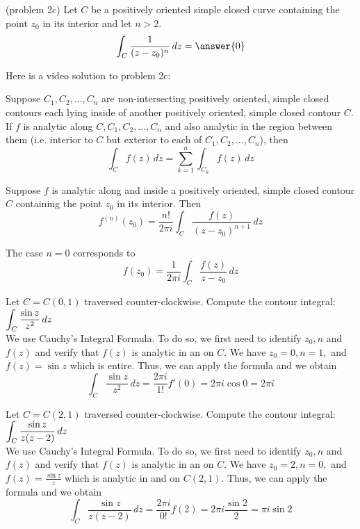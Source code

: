 \documentclass[handout]{ximera}
\begin{document}
\begin{problem}(problem 2c)
Let $C$ be a positively oriented simple closed curve containing the point $z_0$ in its interior and let $n > 2$.\\
\[
\int_C \frac{1}{(z-z_0)^n} \, dz = \answer{0}
\]
\end{problem}


Here is a video solution to problem 2c:\\
\begin{foldable}
\end{foldable}

\begin{theorem}
Suppose $C_1, C_2, ..., C_n$ are non-intersecting positively oriented, simple closed contours each lying inside of another positively oriented, simple closed contour $C$.  
If $f$ is analytic along $C, C_1, C_2, ..., C_n$ and also analytic in the region between them (i.e. interior to $C$ but exterior to each of $C_1, C_2, ..., C_n$), then
\[
\int_C f(z) \, dz = \sum_{k=1}^n \int_{C_k} f(z) \, dz
\]
\end{theorem}



\begin{theorem}
Suppose $f$ is analytic along and inside a positively oriented, simple closed contour $C$ containing the point $z_0$ in its interior.
Then
\[
f^{(n)}(z_0) = \frac{n!}{2\pi i} \int_C \frac{f(z)}{(z-z_0)^{n+1}} \, dz
\]
\end{theorem}

\begin{remark}
The case $n=0$ corresponds to 
\[
f(z_0) = \frac{1}{2\pi i} \int_C \frac{f(z)}{z-z_0} \, dz
\]
\end{remark}


\begin{example}[example 3a]
Let $C = C(0, 1)$ traversed counter-clockwise. Compute the contour integral: $\displaystyle \int_C \frac{\sin z}{z^2} \, dz$\\
We use Cauchy's Integral Formula.  To do so, we first need to identify $z_0, n$ and $f(z)$ and verify that $f(z)$ is analytic in an on $C$.
We have $z_0 = 0, n=1, $ and $f(z) = \sin z$ which is entire. Thus, we can apply the formula and we obtain
\[
\int_C \frac{\sin z}{z^2} \, dz = \frac{2\pi i}{1!} f'(0) = 2\pi i \cos 0  = 2 \pi i
\]
\end{example}

\begin{example}[example 3b]
Let $C = C(2, 1)$ traversed counter-clockwise. Compute the contour integral: $\displaystyle \int_C \frac{\sin z}{z(z-2)} \, dz$\\
We use Cauchy's Integral Formula.  To do so, we first need to identify $z_0, n$ and $f(z)$ and verify that $f(z)$ is analytic in an on $C$.
We have $z_0 = 2, n=0, $ and $f(z) = \frac{\sin z}{z}$ which is analytic in and on $C(2,1)$. Thus, we can apply the formula and we obtain
\[
\int_C \frac{\sin z}{z(z-2)} \, dz = \frac{2\pi i}{0!} f(2) = 2\pi i \frac{\sin 2}{2}  =  \pi i \sin 2
\]
\end{example}
\end{document}
